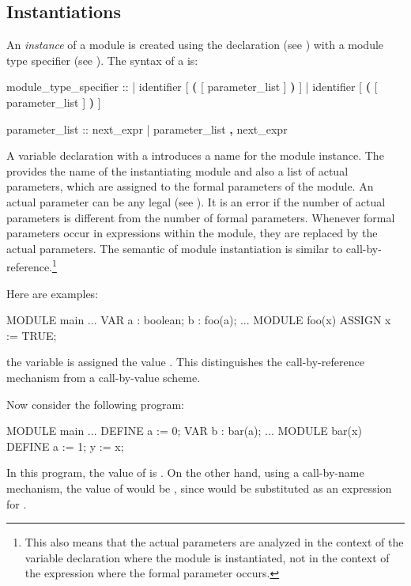 \subsection { Instantiations}
\label{MODULE Instantiations}

An \emph{instance} of a module is created using the 
declaration (see ) with a module type specifier
(see ).
%
The syntax of a  is:

\begin{Grammar}
module_type_specifier ::
      | identifier [ \textbf{(} [ parameter_list ] \textbf{)} ]
      |  identifier [ \textbf{(} [ parameter_list ] \textbf{)} ]

parameter_list ::
        next_expr
      | parameter_list \textbf{,} next_expr
\end{Grammar}
%
A variable declaration with a 
introduces a name for the module instance.
%
The  provides the name of the
instantiating module and also a list of actual parameters, which are
assigned to the formal parameters of the module.
%
An actual parameter can be any legal  (see
).
%
It is an error if the number of actual parameters is different from
the number of formal parameters.
%
Whenever formal parameters occur in expressions within the module,
they are replaced by the actual parameters.
%
The semantic of module instantiation is similar to
call-by-reference.\footnote{This also means that the actual parameters
are analyzed in the context of the variable declaration where the module
is instantiated, not in the context of the expression where the formal
parameter occurs.}

Here are examples:
%
\begin{nusmvCode}
MODULE main
...
 VAR
  a : boolean;
  b : foo(a);
...
MODULE foo(x)
 ASSIGN
   x := TRUE;
\end{nusmvCode}
%
the variable  is assigned the value .
%
This distinguishes the call-by-reference mechanism from a
call-by-value scheme.

\noindent Now consider the following program:
%
\begin{nusmvCode}
MODULE main
...
 DEFINE
   a := 0;
 VAR
   b : bar(a);
...
MODULE bar(x)
 DEFINE
   a := 1;
   y := x;
\end{nusmvCode}
%
In this program, the value of  is . On the other hand,
using a call-by-name mechanism, the value of  would be
, since  would be substituted as an expression for
.

